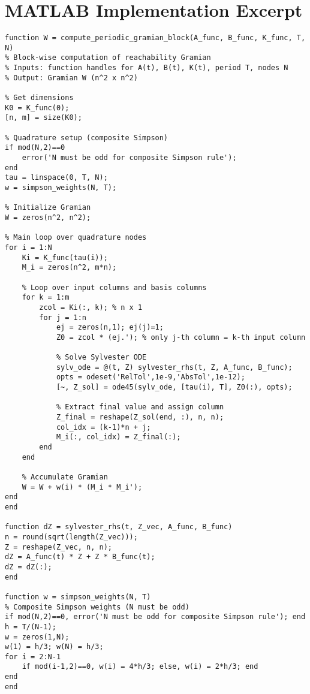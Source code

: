\documentclass[5p,times]{elsarticle} %
\begin{document}
\section{MATLAB Implementation Excerpt}
\begin{lstlisting}
function W = compute_periodic_gramian_block(A_func, B_func, K_func, T, N)
% Block-wise computation of reachability Gramian
% Inputs: function handles for A(t), B(t), K(t), period T, nodes N
% Output: Gramian W (n^2 x n^2)

% Get dimensions
K0 = K_func(0);
[n, m] = size(K0);

% Quadrature setup (composite Simpson)
if mod(N,2)==0
    error('N must be odd for composite Simpson rule');
end
tau = linspace(0, T, N);
w = simpson_weights(N, T);

% Initialize Gramian
W = zeros(n^2, n^2);

% Main loop over quadrature nodes
for i = 1:N
    Ki = K_func(tau(i));
    M_i = zeros(n^2, m*n);

    % Loop over input columns and basis columns
    for k = 1:m
        zcol = Ki(:, k); % n x 1
        for j = 1:n
            ej = zeros(n,1); ej(j)=1;
            Z0 = zcol * (ej.'); % only j-th column = k-th input column

            % Solve Sylvester ODE
            sylv_ode = @(t, Z) sylvester_rhs(t, Z, A_func, B_func);
            opts = odeset('RelTol',1e-9,'AbsTol',1e-12);
            [~, Z_sol] = ode45(sylv_ode, [tau(i), T], Z0(:), opts);

            % Extract final value and assign column
            Z_final = reshape(Z_sol(end, :), n, n);
            col_idx = (k-1)*n + j;
            M_i(:, col_idx) = Z_final(:);
        end
    end

    % Accumulate Gramian
    W = W + w(i) * (M_i * M_i');
end
end

function dZ = sylvester_rhs(t, Z_vec, A_func, B_func)
n = round(sqrt(length(Z_vec)));
Z = reshape(Z_vec, n, n);
dZ = A_func(t) * Z + Z * B_func(t);
dZ = dZ(:);
end

function w = simpson_weights(N, T)
% Composite Simpson weights (N must be odd)
if mod(N,2)==0, error('N must be odd for composite Simpson rule'); end
h = T/(N-1);
w = zeros(1,N);
w(1) = h/3; w(N) = h/3;
for i = 2:N-1
    if mod(i-1,2)==0, w(i) = 4*h/3; else, w(i) = 2*h/3; end
end
end
\end{lstlisting}
\end{document}
